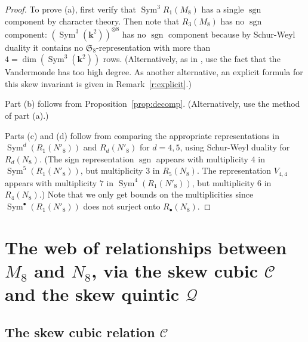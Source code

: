 \documentclass{amsart}
\newcommand{\cut}[1]{}
\theoremstyle{definition}
\theoremstyle{remark}
\DeclareMathOperator{\Sym}{Sym}
\DeclareMathOperator{\sgn}{sgn}
\def\SS{\mathfrak{S}}
\def\fieldk{\mathbf{k}}
\def\cubic{\mathcal{C}}
\def\quintic{\mathcal{Q}}
\begin{document}
\begin{proof}
To prove (a), first verify that $\Sym^3 R_1(M_8)$ has a single $\sgn$ component by character theory.\cut{As alternative:  we need to show that there is at least one; then to show that there is only one.  To show
      there is at least one, refer to the argument given in the original paper. To show there is only one, use the
      fact that this is the cubic hypersurface.  Or the only one with these 14 derivatives.  I want to think
      this through.}
Then note that $R_3(M_8)$ has no $\sgn$ component: $(\Sym^3( \fieldk^2))^{\otimes 8}$ has no $\sgn$ component because
by Schur-Weyl duality it contains no $\SS_8$-representation with more than $4 = \dim (\Sym^3(\fieldk^2))$ rows.
(Alternatively, as in \cite[\S 2]{hmsvCR}, use the fact that the
Vandermonde has too high degree.
As another alternative,
 an explicit formula for this skew invariant is given in
Remark~\ref{r:explicit}.)

Part (b) follows from Proposition~\ref{prop:decomp}.  (Alternatively, use the method of part (a).)

Parts (c) and (d) follow from comparing the appropriate representations in $\Sym^d( R_1(N'_8))$ and $R_d(N'_8)$ for
$d=4,5$, using Schur-Weyl duality for $R_d(N_8)$.  (The sign representation $\sgn$ appears with multiplicity $4$ in
$\Sym^5(R_1(N'_8))$, but multiplicity $3$ in $R_5(N_8)$.  The representation $V_{4,4}$ appears with multiplicity $7$
in $\Sym^4(R_1(N'_8))$, but multiplicity $6$ in $R_4(N_8)$.)  Note that we only get bounds on the multiplicities
since $\Sym^{\bullet}(R_1(N'_8))$ does not surject onto $R_{\bullet}(N_8)$.
\end{proof}


\section{The web of relationships between $M_8$ and $N_8$, via the skew cubic $\cubic$  and the skew quintic $\quintic$}
\label{s:dualities}


\subsection{The skew cubic relation $\cubic$}
\label{s:threeone}
\end{document}
